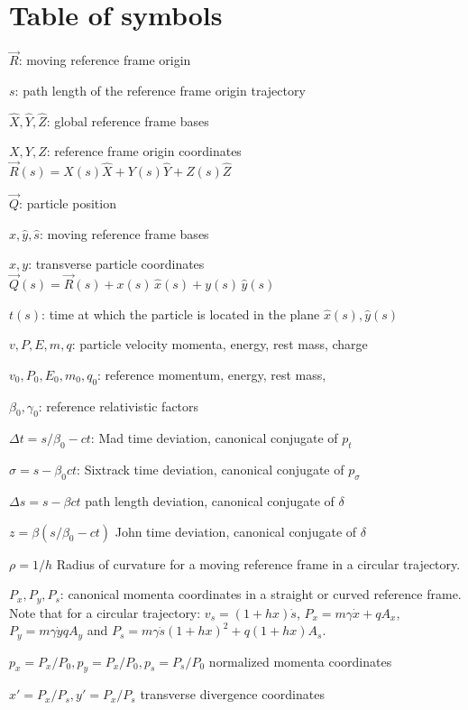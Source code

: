\documentclass[english]{article}
\begin{document}
\section{Table of symbols}

\begin{description}
\item $\vec R$: moving reference frame origin
\item $s$: path length of the reference frame origin trajectory
\item $\hat X, \hat Y,\hat Z$: global reference frame bases
\item $X, Y, Z$: reference frame origin coordinates $\vec R(s)=X(s) \hat X+Y(s) \hat Y+ Z(s) \hat Z$
\item $\vec Q$: particle position
\item $\hat x, \hat y, \hat s$: moving reference frame bases
\item $x, y$: transverse particle coordinates $\vec Q(s)= \vec R(s) + x(s) \,\hat x(s) + y(s)\, \hat y(s)$
\item $t(s)$: time at which the particle is located in the plane $\hat x(s), \hat y(s)$
\item $v, P, E, m, q$: particle velocity momenta, energy, rest mass, charge
\item $v_0, P_0, E_0, m_0, q_0$: reference momentum, energy, rest mass,
\item $\beta_0, \gamma_0$: reference relativistic factors
\item $\Delta t=s/\beta_0 - c t$: Mad time deviation, canonical conjugate of $p_t$
\item $\sigma=s - \beta_0 c t$: Sixtrack time deviation, canonical conjugate of $p_\sigma$
\item $\Delta s=s - \beta c t  $  path length deviation, canonical conjugate of $\delta$
\item $z=\beta(s/\beta_0 - c t) $  John time deviation, canonical conjugate of $\delta$
\item $\rho=1/h$ Radius of curvature for a moving reference frame in a circular trajectory. 
\item $P_x, P_y,  P_s$: canonical momenta coordinates in a straight or curved reference frame. Note that for a circular trajectory: $v_s= (1 +h x) \dot s$, $P_x=m \gamma \dot x + q A_x$, $P_y=m \gamma \dot y q A_y$ and 
$P_s=m \gamma \dot s (1 + h x)^2 + q (1 + h x) A_s$.
\item $p_x=P_x/P_0, p_y=P_x/P_0, p_s=P_s/P_0$ normalized momenta coordinates
\item $x'=P_x/P_s,y'=P_x/P_s$ transverse divergence coordinates

\end{description}
\end{document}

